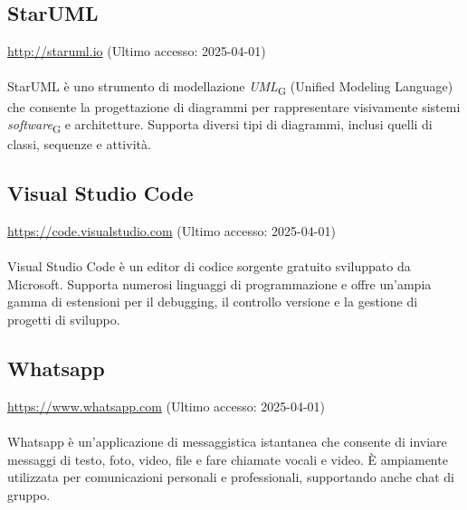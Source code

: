 \subsection{StarUML}
\label{StarUML}
\href{http://staruml.io}{http://staruml.io} (Ultimo accesso: 2025-04-01) \\ \\  
StarUML è uno strumento di modellazione \textit{UML}\textsubscript{G} (Unified Modeling Language) che consente la progettazione di diagrammi per rappresentare visivamente sistemi \textit{software}\textsubscript{G} e architetture. Supporta diversi tipi di diagrammi, inclusi quelli di classi, sequenze e attività.

\subsection{Visual Studio Code}
\label{Visual Studio Code}
\href{https://code.visualstudio.com}{https://code.visualstudio.com} (Ultimo accesso: 2025-04-01) \\ \\  
Visual Studio Code è un editor di codice sorgente gratuito sviluppato da Microsoft. Supporta numerosi linguaggi di programmazione e offre un'ampia gamma di estensioni per il debugging, il controllo versione e la gestione di progetti di sviluppo.

\subsection{Whatsapp}
\label{Whatsapp}
\href{https://www.whatsapp.com}{https://www.whatsapp.com} (Ultimo accesso: 2025-04-01) \\ \\  
Whatsapp è un'applicazione di messaggistica istantanea che consente di inviare messaggi di testo, foto, video, file e fare chiamate vocali e video. È ampiamente utilizzata per comunicazioni personali e professionali, supportando anche chat di gruppo.
